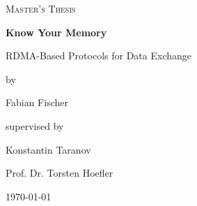 \documentclass{article}
\theoremstyle{plain}
\theoremstyle{definition}
\theoremstyle{remark}
\begin{document}
\iffalse
\fi
\newcommand{\seqnode}[3][]{ 
  \node[#1] (#2) {#3};
  \node[below of=#2, node distance=5cm] (#2_g) {};
  \draw (#2) -- (#2_g);
}
\newcommand{\hseqnode}[3][]{ 
  \node[#1] (#2) {#3};
  \node[below of=#2, node distance=5cm] (#2_g) {};
}
\newcommand{\msg}[5][above]{
  \draw[->] ($(#2)!#4!(#2_g)$) -- node[#1,scale=0.75,midway]{#5} ($(#3)!#4+0.04!(#3_g)$);
}
\newcommand{\fetch}[4]{
  \draw[-] ($(#1)!#3-0.04!(#1_g)$) -- node[above,scale=0.75,midway]{#4} ($(#2)!#3!(#2_g)$);
  \draw[->] ($(#2)!#3!(#2_g)$) -- node[above,scale=0.75,midway]{} ($(#1)!#3+0.04!(#1_g)$);
}

\newcommand{\queue}[2][]{ 
  \draw (#2) -- ++(2cm,0) -- ++(0,-1cm) -- ++(-2cm,0);
  \foreach \i in {1,...,4} \draw (#2)++(2cm-\i*3mm,0) -- +(0,-1cm);
  \node[align=center, , xshift = 1cm, yshift = .15cm] at (#2) {#1};
}

\newcommand{\rqueue}[2][]{ 
  \draw (#2) -- ++(2cm,0);
  \draw (#2) -- ++(0,-1cm) -- ++(2cm,0);
  \foreach \i in {1,...,4} \draw (#2)++(\i*3mm,0) -- +(0,-1cm);
  \node[align=center, , xshift = 1cm, yshift = .15cm] at (#2) {#1};
}


\begin{titlepage}
	\centering
	{\scshape\Large Master's Thesis\par}
	\vspace{1.5cm}
  {\huge\bfseries Know Your Memory\par}
  {\Large RDMA-Based Protocols for Data Exchange\par}
	\vspace{2cm}
	{\Large by \par Fabian Fischer\par}
	\vfill
	supervised by\par
	Konstantin Taranov\par
  Prof. Dr. Torsten Hoefler

	\vfill

	{\large \today\par}
\end{titlepage}

 
\tableofcontents
\pagebreak

\pagebreak

\pagebreak





\pagebreak

\pagebreak


\pagebreak


\pagebreak


\pagebreak



\pagebreak


\pagebreak



\pagebreak


\pagebreak


\pagebreak



\pagebreak


{}



\end{document}
